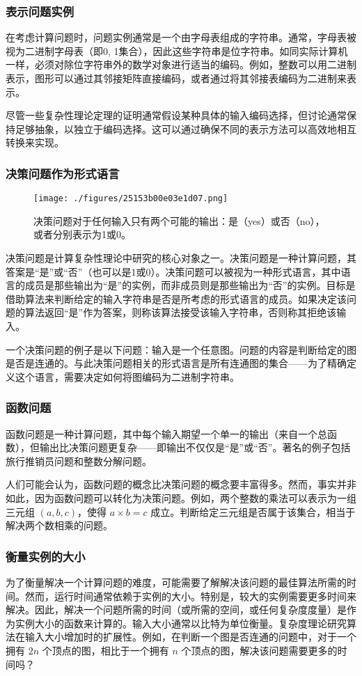 \subsubsection{表示问题实例}  
在考虑计算问题时，问题实例通常是一个由字母表组成的字符串。通常，字母表被视为二进制字母表（即{0, 1}集合），因此这些字符串是位字符串。如同实际计算机一样，必须对除位字符串外的数学对象进行适当的编码。例如，整数可以用二进制表示，图形可以通过其邻接矩阵直接编码，或者通过将其邻接表编码为二进制来表示。

尽管一些复杂性理论定理的证明通常假设某种具体的输入编码选择，但讨论通常保持足够抽象，以独立于编码选择。这可以通过确保不同的表示方法可以高效地相互转换来实现。
\subsubsection{决策问题作为形式语言}
\begin{figure}[ht]
\centering
\texttt{[image: ./figures/25153b00e03e1d07.png]}
\caption{决策问题对于任何输入只有两个可能的输出：是（yes）或否（no），或者分别表示为1或0。} \label{fig_JSFZ_2}
\end{figure}
决策问题是计算复杂性理论中研究的核心对象之一。决策问题是一种计算问题，其答案是“是”或“否”（也可以是1或0）。决策问题可以被视为一种形式语言，其中语言的成员是那些输出为“是”的实例，而非成员则是那些输出为“否”的实例。目标是借助算法来判断给定的输入字符串是否是所考虑的形式语言的成员。如果决定该问题的算法返回“是”作为答案，则称该算法接受该输入字符串，否则称其拒绝该输入。

一个决策问题的例子是以下问题：输入是一个任意图。问题的内容是判断给定的图是否是连通的。与此决策问题相关的形式语言是所有连通图的集合——为了精确定义这个语言，需要决定如何将图编码为二进制字符串。
\subsubsection{函数问题}
函数问题是一种计算问题，其中每个输入期望一个单一的输出（来自一个总函数），但输出比决策问题更复杂——即输出不仅仅是“是”或“否”。著名的例子包括旅行推销员问题和整数分解问题。

人们可能会认为，函数问题的概念比决策问题的概念要丰富得多。然而，事实并非如此，因为函数问题可以转化为决策问题。例如，两个整数的乘法可以表示为一组三元组 \((a, b, c)\)，使得 \(a \times b = c\) 成立。判断给定三元组是否属于该集合，相当于解决两个数相乘的问题。
\subsubsection{衡量实例的大小}
为了衡量解决一个计算问题的难度，可能需要了解解决该问题的最佳算法所需的时间。然而，运行时间通常依赖于实例的大小。特别是，较大的实例需要更多时间来解决。因此，解决一个问题所需的时间（或所需的空间，或任何复杂度度量）是作为实例大小的函数来计算的。输入大小通常以比特为单位衡量。复杂度理论研究算法在输入大小增加时的扩展性。例如，在判断一个图是否连通的问题中，对于一个拥有 \(2n\) 个顶点的图，相比于一个拥有 \(n\) 个顶点的图，解决该问题需要更多的时间吗？

